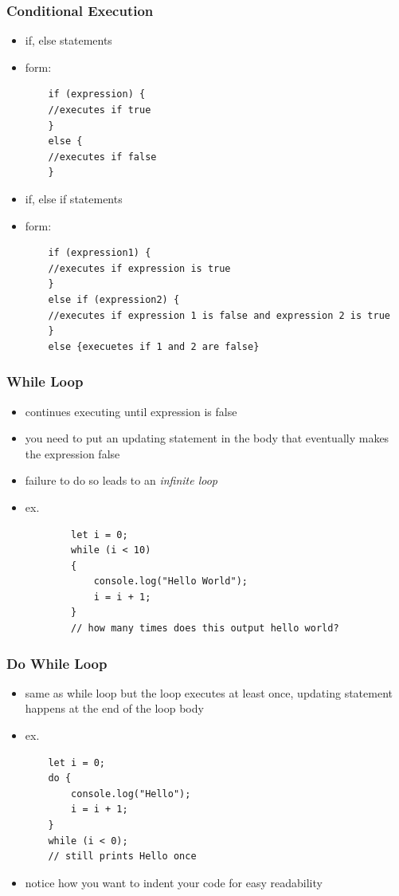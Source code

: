 \documentclass{beamer}
\begin{document}
\begin{frame}[fragile]
\frametitle{Conditional Execution}
\begin{itemize}
	\item if, else statements
	\item form: \begin{lstlisting}
	if (expression) {
	//executes if true
	}
	else {
	//executes if false
	}
	\end{lstlisting}
	\item if, else if statements
	\item form: \begin{lstlisting} 
	if (expression1) {
	//executes if expression is true
	}
	else if (expression2) {
	//executes if expression 1 is false and expression 2 is true
	}
	else {execuetes if 1 and 2 are false} 
	\end{lstlisting}
\end{itemize}
\end{frame}

\begin{frame}[fragile]
\frametitle{While Loop}
\begin{itemize}
	\item continues executing until expression is false
	\item you need to put an updating statement in the body that eventually makes the expression false
	\item failure to do so leads to an \emph{infinite loop}
	\item ex. \begin{lstlisting}
		let i = 0;
		while (i < 10)
		{
			console.log("Hello World");
			i = i + 1;
		}
		// how many times does this output hello world?
		\end{lstlisting}
\end{itemize}
\end{frame}

\begin{frame}[fragile]
\frametitle{Do While Loop}
\begin{itemize}
	\item same as while loop but the loop executes at least once, updating statement happens at the end of the loop body
	\item ex. \begin{lstlisting}
	let i = 0;
	do {
		console.log("Hello");
		i = i + 1;
	}
	while (i < 0);
	// still prints Hello once
	\end{lstlisting}
\item notice how you want to indent your code for easy readability
\end{itemize}
\end{frame}
\end{document}
